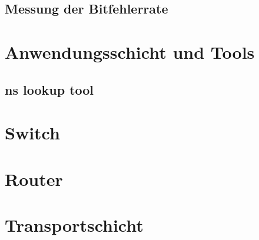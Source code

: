 \documentclass{scrartcl}
\begin{document}
  \subsection[Aufgabe 3 Messung der Bitfehlerrate]{Messung der Bitfehlerrate}
 
 
  \newpage
\section[Versuch 3 Anwendungsschicht und Tools]{Anwendungsschicht und Tools}

  \subsection[Aufgabe 4 ns lookup tool]{ns lookup tool}


  \newpage
\section[Versuch 4 Switch]{Switch}


  \newpage
\section[Versuch 5 Router]{Router}
 
 
  \newpage
\section[Versuch 6 Transportschicht]{Transportschicht}
  
\end{document}
